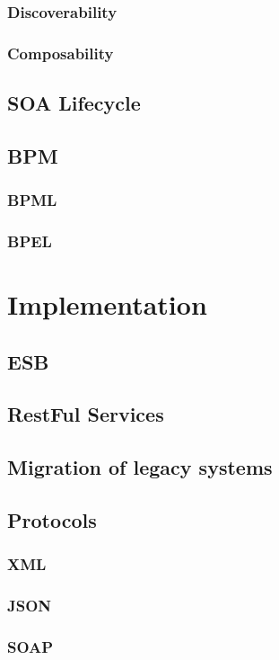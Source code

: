 \documentclass[10pt]{article}
\begin{document}
\subsubsection{Discoverability}
\subsubsection{Composability}
\subsection{SOA Lifecycle}
\subsection{BPM}
\subsubsection{BPML}
\subsubsection{BPEL}

\section{Implementation}
\subsection{ESB}
\subsection{RestFul Services}
\subsection{Migration of legacy systems}
\subsection{Protocols}
\subsubsection{XML}
\subsubsection{JSON}
\subsubsection{SOAP}
\end{document}
